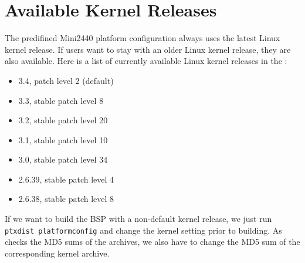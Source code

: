 %
%
%
%
%
%

\newcommand{\perCpuName}{S3C2440}
\newcommand{\curKernelRev}{3.4}

\section{Available Kernel Releases}	\label{sec:kernelreleases}

The predifined Mini2440 platform configuration always uses the latest Linux
kernel release. If users want to stay with an older Linux kernel release,
they are also available. Here is a list of currently available Linux kernel
releases in the \ptxdistBSPName{}:

\begin{itemize}
	\item \curKernelRev{}, patch level 2 (default)
	\item 3.3, stable patch level 8
	\item 3.2, stable patch level 20
	\item 3.1, stable patch level 10
	\item 3.0, stable patch level 34
	\item 2.6.39, stable patch level 4
	\item 2.6.38, stable patch level 8
\end{itemize}

If we want to build the BSP with a non-default kernel release, we just run
\texttt{ptxdist platformconfig} and change the kernel setting prior to building.
As \ptxdist{} checks the MD5 sums of the archives, we also have to change the
MD5 sum of the corresponding kernel archive.

